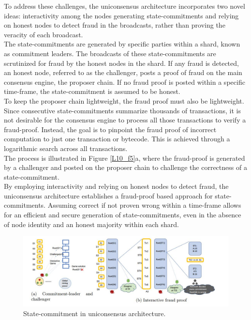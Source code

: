 \begin{enumerate}
	To address these challenges, the uniconsensus architecture incorporates two novel ideas: interactivity among the nodes generating state-commitments and relying on honest nodes to detect fraud in the broadcasts, rather than proving the veracity of each broadcast.\\
	The state-commitments are generated by specific parties within a shard, known as commitment leaders. The broadcasts of these state-commitments are scrutinized for fraud by the honest nodes in the shard. If any fraud is detected, an honest node, referred to as the challenger, posts a proof of fraud on the main consensus engine, the proposer chain. If no fraud proof is posted within a specific time-frame, the state-commitment is assumed to be honest.\\
	To keep the proposer chain lightweight, the fraud proof must also be lightweight. Since consecutive state-commitments summarize thousands of transactions, it is not desirable for the consensus engine to process all those transactions to verify a fraud-proof. Instead, the goal is to pinpoint the fraud proof of incorrect computation to just one transaction or bytecode. This is achieved through a logarithmic search across all transactions.\\
	The process is illustrated in Figure \ref{L10_f5}a, where the fraud-proof is generated by a challenger and posted on the proposer chain to challenge the correctness of a state-commitment.\\
	By employing interactivity and relying on honest nodes to detect fraud, the uniconsensus architecture establishes a fraud-proof based approach for state-commitments. Assuming correct if not proven wrong within a time-frame allows for an efficient and secure generation of state-commitments, even in the absence of node identity and an honest majority within each shard.
	\begin{center}
		\begin{figure}
			\centering
			\includegraphics[width=0.8\linewidth]{Fig/10/F5}
			\caption{State-commitment in uniconsensus architecture.}
			\label{fig:L10_f5}
		\end{figure}
	\end{center}

\end{enumerate}
